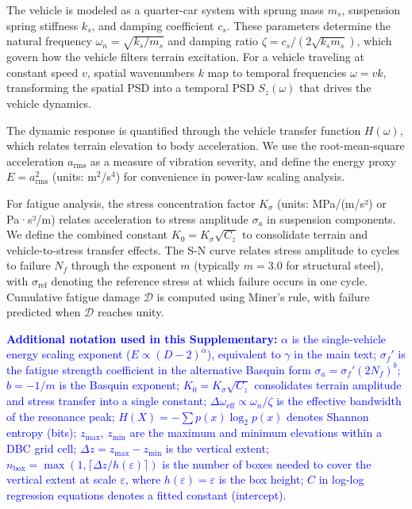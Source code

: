 \documentclass[11pt]{article}
\begin{document}
The vehicle is modeled as a quarter-car system with sprung mass $m_s$, suspension spring stiffness $k_s$, and damping coefficient $c_s$. These parameters determine the natural frequency $\omega_n = \sqrt{k_s/m_s}$ and damping ratio $\zeta = c_s/(2\sqrt{k_s m_s})$, which govern how the vehicle filters terrain excitation. For a vehicle traveling at constant speed $v$, spatial wavenumbers $k$ map to temporal frequencies $\omega = vk$, transforming the spatial PSD into a temporal PSD $S_z(\omega)$ that drives the vehicle dynamics.

The dynamic response is quantified through the vehicle transfer function $H(\omega)$, which relates terrain elevation to body acceleration. We use the root-mean-square acceleration $a_{\text{rms}}$ as a measure of vibration severity, and define the energy proxy $E = a_{\text{rms}}^2$ (units: m$^2$/s$^4$) for convenience in power-law scaling analysis.

For fatigue analysis, the stress concentration factor $K_\sigma$ (units: MPa/(m/s²) or Pa·s²/m) relates acceleration to stress amplitude $\sigma_a$ in suspension components. We define the combined constant $K_0 = K_\sigma\sqrt{C_z}$ to consolidate terrain and vehicle-to-stress transfer effects. The S-N curve relates stress amplitude to cycles to failure $N_f$ through the exponent $m$ (typically $m = 3.0$ for structural steel), with $\sigma_{\text{ref}}$ denoting the reference stress at which failure occurs in one cycle. Cumulative fatigue damage $\mathcal{D}$ is computed using Miner's rule, with failure predicted when $\mathcal{D}$ reaches unity.

\textcolor{blue}{\textbf{Additional notation used in this Supplementary:} $\alpha$ is the single-vehicle energy scaling exponent ($E \propto (D-2)^\alpha$), equivalent to $\gamma$ in the main text; $\sigma_f'$ is the fatigue strength coefficient in the alternative Basquin form $\sigma_a = \sigma_f'(2N_f)^b$; $b = -1/m$ is the Basquin exponent; $K_0 = K_\sigma\sqrt{C_z}$ consolidates terrain amplitude and stress transfer into a single constant; $\Delta\omega_{\text{eff}} \propto \omega_n/\zeta$ is the effective bandwidth of the resonance peak; $H(X) = -\sum p(x)\log_2 p(x)$ denotes Shannon entropy (bits); $z_{\max}$, $z_{\min}$ are the maximum and minimum elevations within a DBC grid cell; $\Delta z = z_{\max} - z_{\min}$ is the vertical extent; $n_{\text{box}} = \max(1, \lceil \Delta z / h(\varepsilon) \rceil)$ is the number of boxes needed to cover the vertical extent at scale $\varepsilon$, where $h(\varepsilon) = \varepsilon$ is the box height; $C$ in log-log regression equations denotes a fitted constant (intercept).}
\end{document}
